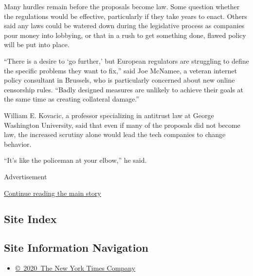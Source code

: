 Many hurdles remain before the proposals become law. Some question
whether the regulations would be effective, particularly if they take
years to enact. Others said any laws could be watered down during the
legislative process as companies pour money into lobbying, or that in a
rush to get something done, flawed policy will be put into place.

``There is a desire to `go further,' but European regulators are
struggling to define the specific problems they want to fix,'' said Joe
McNamee, a veteran internet policy consultant in Brussels, who is
particularly concerned about new online censorship rules. ``Badly
designed measures are unlikely to achieve their goals at the same time
as creating collateral damage.''

William E. Kovacic, a professor specializing in antitrust law at George
Washington University, said that even if many of the proposals did not
become law, the increased scrutiny alone would lead the tech companies
to change behavior.

``It's like the policeman at your elbow,'' he said.

Advertisement

\protect\hyperlink{after-bottom}{Continue reading the main story}

\hypertarget{site-index}{%
\subsection{Site Index}\label{site-index}}

\hypertarget{site-information-navigation}{%
\subsection{Site Information
Navigation}\label{site-information-navigation}}

\begin{itemize}
\tightlist
\item
  \href{https://help.nytimes.com/hc/en-us/articles/115014792127-Copyright-notice}{©~2020~The
  New York Times Company}
\end{itemize}

